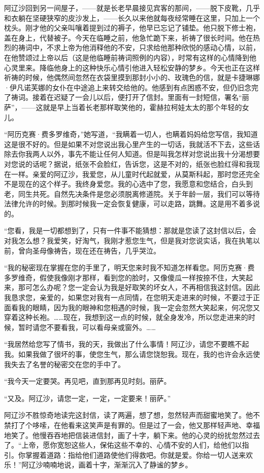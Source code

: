 \par 阿辽沙回到另一间屋子，——就是长老早晨接见宾客的那间，——脱下皮靴，几乎和衣躺在坚硬狭窄的皮沙发上，——长久以来他就每夜经常睡在这里，只加上一个枕头。刚才他的父亲叫嚷着提到过的褥子，他早已忘记了铺垫。他只脱下修士袍，盖在身上，代替被子。今天在临睡之前，他急忙跪下来，祈祷了很长时间。他在热烈的祷词中，不求上帝为他消释他的不安，只求给他那种欣悦的感动心情，以前，在他赞颂过上帝以后（这是他临睡前祷词照例的内容），时常有这样的心情降到他心灵里来。降临他身上的这种快乐心情引他进入轻松安静的梦乡。今天也正在这样祈祷的时候，他偶然间忽然在衣袋里摸到那封小小的、玫瑰色的信，就是卡捷琳娜·伊凡诺芙娜的女仆在中途追上来转交给他的。他感到有点困惑不安，但仍旧念完了祷词。接着在迟疑了一会儿以后，便打开了信封。里面有一封短信，署名“丽萨”，——这就是早上当着长老那样取笑他的，霍赫拉柯娃太太的那个年轻的女儿。
\par “阿历克赛·费多罗维奇，”她写道，“我瞒着一切人，也瞒着妈妈给您写信，我知道这是很不好的。但是如果不对您说出我心里产生的一切话，我就活不下去，这些话除去你我两人以外，事先不能让任何人知道。但是叫我怎样对您说出我十分渴想要对您说的话呢？据说，纸张不会脸红，告诉您，这是不对的，纸张也脸红得和我现在一样。亲爱的阿辽沙，我爱您，从儿童时代起就爱，从莫斯科起，那时您还完全不是现在的这个样子。我终身爱您。我的心选中了您，我愿意和您结合，白头到老，同生共死。自然先决条件是您必须脱离修道院。关于年龄一层，我们可以等待法律允许的时候。到那时候我一定会恢复健康，可以走路，跳舞。这是用不着多说的。
\par “您看，我是一切都想到了，只有一件事不能猜想：那就是您读了这封信以后，会对我怎么想？我爱笑，好淘气，我刚才惹您生气，但是我对您说实话，我在执笔以前，曾向圣母像祷告，现在还在祷告，几乎哭泣。
\par “我的秘密现在掌握在您的手里了，明天您来时我不知道怎样看您。阿历克赛·费多罗维奇，假使我像刚才那样，看到您的脸时，又像傻瓜一样按捺不住，大笑起来，那可怎么办呢？您一定会认为我是好取笑的坏女人，不再相信我这封信。因此我恳求您，亲爱的，如果您对我有一点同情，在您明天走进来的时候，不要过于正面看我的眼睛，因为我的眼神和您相遇的时候，我一定会忽然大笑起来，何况您又穿着这种长袍。……现在，我想到这一点的时候，就全身发冷，所以您走进来的时候，暂时请您不要看我，可以看母亲或窗外。……
\par “我居然给您写了情书，我的天，我做出了什么事情！阿辽沙，请您不要瞧不起我。如果我做了很坏的事，使您生气，那么请您饶恕我。现在，我的也许会永远使我失去了名誉的秘密交在您的手中了。
\par “我今天一定要哭。再见吧，直到那再见时刻。丽萨。
\par “又及。阿辽沙，请您一定，一定，一定要来！丽萨。”
\par 阿辽沙不胜惊奇地读完这封信，读了两遍，想了想，忽然轻声而甜蜜地笑了。他不禁打了个哆嗦，在他看来这笑声是有罪的。但是过了一会，他又那样轻声地、幸福地笑了。他慢吞吞地把信装进信封，画了十字，躺下来。他的心灵的纷扰忽然过去了。“上帝，愿你宽恕这些人，保佑这些不幸的、心情不安的人们，给他们以指引。你掌握着道路：指给他们道路使他们得救吧。你就是爱。你给一切人送来欢乐！”阿辽沙喃喃地说，画着十字，渐渐沉入了静谧的梦乡。





